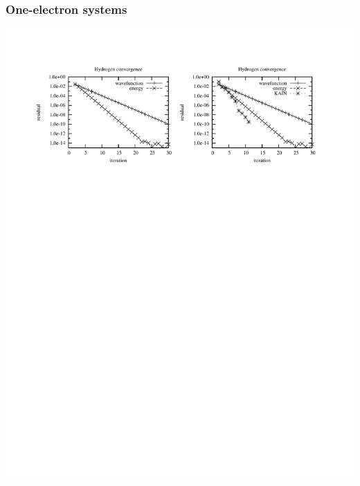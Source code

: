 \begin{frame}
    \frametitle{One-electron systems}
    \begin{center}
	\includegraphics[scale=1.0, clip, viewport = 50 550 300 730]{figures/h_convergence.pdf}
    \end{center}
\end{frame}


